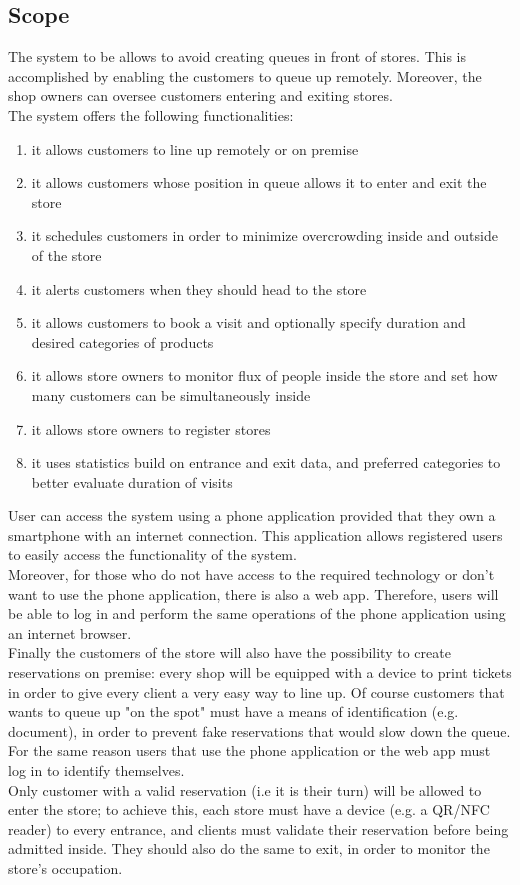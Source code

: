 \subsection{Scope}
The system to be allows to avoid creating queues in front of stores.
This is accomplished by enabling the customers to queue up remotely.
Moreover, the shop owners can oversee customers entering and exiting stores. \\
The system offers the following functionalities:
\begin{enumerate}[label=F\arabic*]
	\item it allows customers to line up remotely or on premise
	\item it allows customers whose position in queue allows it to enter and exit the store
	\item it schedules customers in order to minimize overcrowding inside and outside of the store
	\item it alerts customers when they should head to the store
	\item it allows customers to book a visit and optionally specify duration and desired categories of products
	\item it allows store owners to monitor flux of people inside the store and set how many customers can be simultaneously inside
	\item it allows store owners to register stores
	\item it uses statistics build on entrance and exit data, and preferred categories to better evaluate duration of visits
\end{enumerate}
User can access the system using a phone application provided that they own a smartphone with an internet connection. This application allows registered users to easily access the functionality of the system.\\Moreover, for those who do not have access to the required technology or don't want to use the phone application, there is also a web app. Therefore, users will be able to log in and perform the same operations of the phone application using an internet browser.\\ Finally the customers of the store will also have the possibility to create reservations on premise: every shop will be equipped with a device to print tickets in order to give every client a very easy way to line up. Of course customers that wants to queue up "on the spot" must have a means of identification (e.g. document), in order to prevent fake reservations that would slow down the queue. For the same reason users that use the phone application or the web app must log in to identify themselves.\\
Only customer with a valid reservation (i.e it is their turn) will be allowed to enter the store; to achieve this, each store must have a device (e.g. a QR/NFC reader) to every entrance, and clients must validate their reservation before being admitted inside. They should also do the same to exit, in order to monitor the store's occupation.
